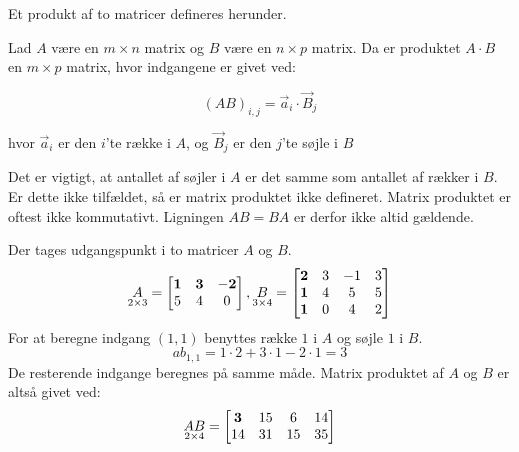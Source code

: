 Et produkt af to matricer defineres herunder. 
\begin{defn} 
Lad $A$ være en $m \times n$ matrix og $B$ være en $n \times p$ matrix. Da er produktet $A \cdot B$ en $m \times p$ matrix, hvor indgangene er givet ved: 

$$(AB)_{i,j} = \vec{a}_i \cdot \vec{B}_j$$

hvor $\vec{a}_i$ er den $i$'te række i $A$, og $\vec{B}_j$ er den $j$'te søjle i $B$
\label{def:(matrixprodukt)}
\end{defn}
Det er vigtigt, at antallet af søjler i $A$ er det samme som antallet af rækker i $B$. Er dette ikke tilfældet, så er matrix produktet ikke defineret. Matrix produktet er oftest ikke kommutativt. Ligningen $AB=BA$ er derfor ikke altid gældende. 
\begin{eks}
Der tages udgangspunkt i to matricer $A$ og $B$. 
\begin{align*}
\underset{2 \times 3}{A}= \begin{bmatrix}
	\bf{1} & \bf{3} & \bf{-2} \\
	5 & 4 & 0 	
\end{bmatrix},
\underset{3 \times 4}{B}= \begin{bmatrix}
	\bf{2} & 3 & -1 & 3 \\
	\bf{1} & 4 & 5 & 5\\
	\bf{1} & 0 & 4 & 2
\end{bmatrix}  
\end{align*}
For at beregne indgang $(1,1)$ benyttes række $1$ i $A$ og søjle $1$ i $B$. 
$$ab_{1,1}=1\cdot 2+3\cdot 1-2 \cdot 1 = 3$$ 
De resterende indgange beregnes på samme måde. 
Matrix produktet af $A$ og $B$ er altså givet ved:
\begin{align*}
\underset{2 \times 4}{AB}= \begin{bmatrix}
	\bf{3} & 15 & 6 & 14 \\
	14 & 31 & 15 & 35
\end{bmatrix}  
\end{align*}
\end{eks}